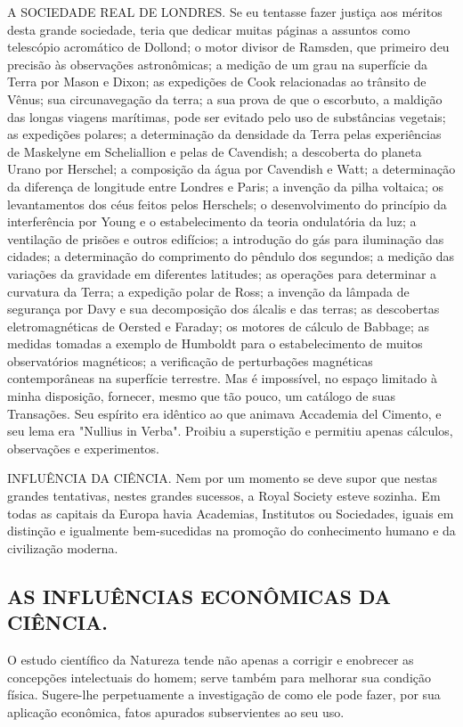 \documentclass[11pt,a5paper,twoside,openany]{book}
\begin{document}
A SOCIEDADE REAL DE LONDRES. Se eu tentasse fazer justiça aos méritos desta grande sociedade, teria que dedicar muitas páginas a assuntos como telescópio acromático de Dollond; o motor divisor de Ramsden, que primeiro deu precisão às observações astronômicas; a medição de um grau na superfície da Terra por Mason e Dixon; as expedições de Cook relacionadas ao trânsito de Vênus; sua circunavegação da terra; a sua prova de que o escorbuto, a maldição das longas viagens marítimas, pode ser evitado pelo uso de substâncias vegetais; as expedições polares; a determinação da densidade da Terra pelas experiências de Maskelyne em Scheliallion e pelas de Cavendish; a descoberta do planeta Urano por Herschel; a composição da água por Cavendish e Watt; a determinação da diferença de longitude entre Londres e Paris; a invenção da pilha voltaica; os levantamentos dos céus feitos pelos Herschels; o desenvolvimento do princípio da interferência por Young e o estabelecimento da teoria ondulatória da luz; a ventilação de prisões e outros edifícios; a introdução do gás para iluminação das cidades; a determinação do comprimento do pêndulo dos segundos; a medição das variações da gravidade em diferentes latitudes; as operações para determinar a curvatura da Terra; a expedição polar de Ross; a invenção da lâmpada de segurança por Davy e sua decomposição dos álcalis e das terras; as descobertas eletromagnéticas de Oersted e Faraday; os motores de cálculo de Babbage; as medidas tomadas a exemplo de Humboldt para o estabelecimento de muitos observatórios magnéticos; a verificação de perturbações magnéticas contemporâneas na superfície terrestre. Mas é impossível, no espaço limitado à minha disposição, fornecer, mesmo que tão pouco, um catálogo de suas Transações. Seu espírito era idêntico ao que animava Accademia del Cimento, e seu lema era "Nullius in Verba". Proibiu a superstição e permitiu apenas cálculos, observações e experimentos.

INFLUÊNCIA DA CIÊNCIA. Nem por um momento se deve supor que nestas grandes tentativas, nestes grandes sucessos, a Royal Society esteve sozinha. Em todas as capitais da Europa havia Academias, Institutos ou Sociedades, iguais em distinção e igualmente bem-sucedidas na promoção do conhecimento humano e da civilização moderna.

\subsection*{AS INFLUÊNCIAS ECONÔMICAS DA CIÊNCIA.}
O estudo científico da Natureza tende não apenas a corrigir e enobrecer as concepções intelectuais do homem; serve também para melhorar sua condição física. Sugere-lhe perpetuamente a investigação de como ele pode fazer, por sua aplicação econômica, fatos apurados subservientes ao seu uso.
\end{document}
